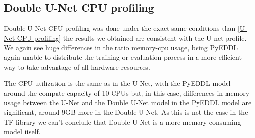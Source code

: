 \vspace{-7pt}
\subsection{Double U-Net CPU profiling}

Double U-Net CPU profiling was done under the exact same conditions than \ref{U-Net CPU profiling} the results we obtained are consistent with the U-net profile. We again see huge differences in the ratio memory-cpu usage, being PyEDDL again unable to distribute the training or evaluation process in a more efficient way to take advantage of all hardware resources. 

The CPU utilization is the same as in the U-Net, with the PyEDDL model around the compute capacity of 10 CPUs but, in this case, differences in memory usage between the U-Net and the Double U-Net model in the PyEDDL model are significant, around 9GB more in the Double U-Net. As this is not the case in the TF library we can't conclude that Double U-Net is a more memory-consuming model itself.
\vspace{-5pt}

